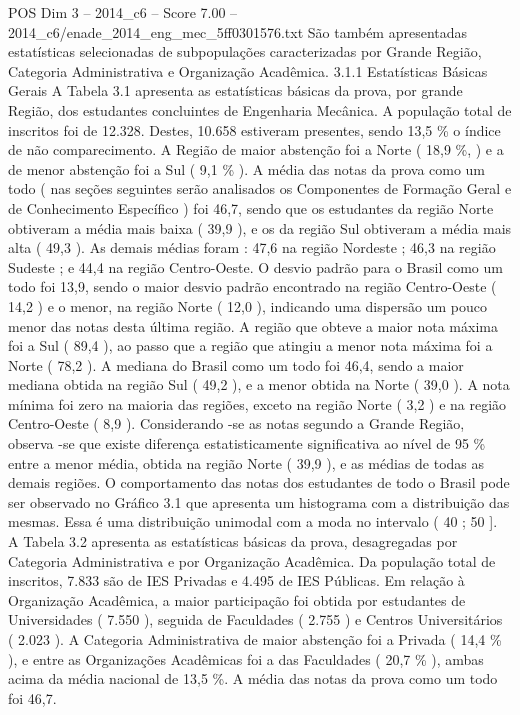 \begin{textsample}{POS Dim 3 – 2014\_c6 – Score 7.00 – 2014\_c6/enade\_2014\_eng\_mec\_5ff0301576.txt}
São também apresentadas estatísticas selecionadas de subpopulações caracterizadas por Grande Região, Categoria Administrativa e Organização Acadêmica. 3.1.1 Estatísticas Básicas Gerais A Tabela 3.1 apresenta as estatísticas básicas da prova, por grande Região, dos estudantes concluintes de Engenharia Mecânica.
A população total de inscritos foi de 12.328.
Destes, 10.658 estiveram presentes, sendo 13,5 \% o índice de não comparecimento.
A Região de maior abstenção foi a Norte ( 18,9 \%, ) e a de menor abstenção foi a Sul ( 9,1 \% ).
A média das notas da prova como um todo ( nas seções seguintes serão analisados os Componentes de Formação Geral e de Conhecimento Específico ) foi 46,7, sendo que os estudantes da região Norte obtiveram a média mais baixa ( 39,9 ), e os da região Sul obtiveram a média mais alta ( 49,3 ).
As demais médias foram : 47,6 na região Nordeste ; 46,3 na região Sudeste ; e 44,4 na região Centro-Oeste.
O desvio padrão para o Brasil como um todo foi 13,9, sendo o maior desvio padrão encontrado na região Centro-Oeste ( 14,2 ) e o menor, na região Norte ( 12,0 ), indicando uma dispersão um pouco menor das notas desta última região.
A região que obteve a maior nota máxima foi a Sul ( 89,4 ), ao passo que a região que atingiu a menor nota máxima foi a Norte ( 78,2 ).
A mediana do Brasil como um todo foi 46,4, sendo a maior mediana obtida na região Sul ( 49,2 ), e a menor obtida na Norte ( 39,0 ).
A nota mínima foi zero na maioria das regiões, exceto na região Norte ( 3,2 ) e na região Centro-Oeste ( 8,9 ).
Considerando -se as notas segundo a Grande Região, observa -se que existe diferença estatisticamente significativa ao nível de 95 \% entre a menor média, obtida na região Norte ( 39,9 ), e as médias de todas as demais regiões.
O comportamento das notas dos estudantes de todo o Brasil pode ser observado no Gráfico 3.1 que apresenta um histograma com a distribuição das mesmas.
Essa é uma distribuição unimodal com a moda no intervalo ( 40 ; 50 ].
A Tabela 3.2 apresenta as estatísticas básicas da prova, desagregadas por Categoria Administrativa e por Organização Acadêmica.
Da população total de inscritos, 7.833 são de IES Privadas e 4.495 de IES Públicas.
Em relação à Organização Acadêmica, a maior participação foi obtida por estudantes de Universidades ( 7.550 ), seguida de Faculdades ( 2.755 ) e Centros Universitários ( 2.023 ).
A Categoria Administrativa de maior abstenção foi a Privada ( 14,4 \% ), e entre as Organizações Acadêmicas foi a das Faculdades ( 20,7 \% ), ambas acima da média nacional de 13,5 \%.
A média das notas da prova como um todo foi 46,7.

\end{textsample}
